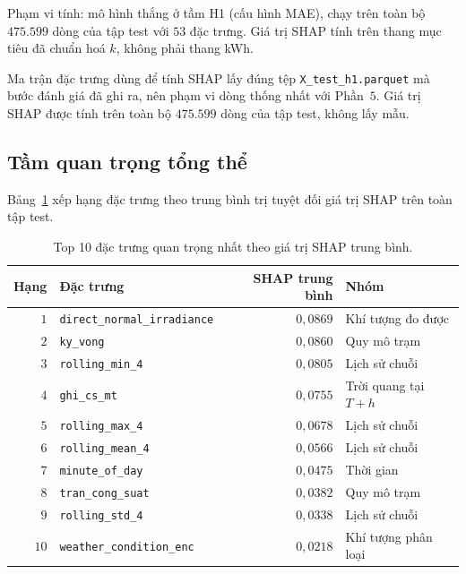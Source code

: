 \documentclass[12pt, a4paper]{report}
\begin{document}
Phạm vi tính: mô hình thắng ở tầm H1 (cấu hình MAE), chạy trên toàn bộ $475.599$ dòng của tập
test với $53$ đặc trưng. Giá trị SHAP tính trên thang mục tiêu đã chuẩn hoá $k$, không phải
thang kWh.

Ma trận đặc trưng dùng để tính SHAP lấy đúng tệp \texttt{X\_test\_h1.parquet} mà bước đánh giá đã
ghi ra, nên phạm vi dòng thống nhất với Phần~$5$. Giá trị SHAP được tính trên toàn bộ
$475.599$ dòng của tập test, không lấy mẫu.

\FloatBarrier
\subsection{Tầm quan trọng tổng thể}

Bảng~\ref{tab:shap_global} xếp hạng đặc trưng theo
trung bình trị tuyệt đối giá trị SHAP trên toàn tập test.

\begin{table}[htbp]
\centering
\caption{Top 10 đặc trưng quan trọng nhất theo giá trị SHAP trung bình.}
\label{tab:shap_global}
\small
\begin{tabular}{r l r l}
\toprule
\textbf{Hạng} & \textbf{Đặc trưng} & \textbf{SHAP trung bình} & \textbf{Nhóm} \\
\midrule
$1$  & \texttt{direct\_normal\_irradiance} & $0{,}0869$ & Khí tượng đo được \\
$2$  & \texttt{ky\_vong}                  & $0{,}0860$ & Quy mô trạm \\
$3$  & \texttt{rolling\_min\_4}            & $0{,}0805$ & Lịch sử chuỗi \\
$4$  & \texttt{ghi\_cs\_mt}                & $0{,}0755$ & Trời quang tại $T{+}h$ \\
$5$  & \texttt{rolling\_max\_4}            & $0{,}0678$ & Lịch sử chuỗi \\
$6$  & \texttt{rolling\_mean\_4}           & $0{,}0566$ & Lịch sử chuỗi \\
$7$  & \texttt{minute\_of\_day}            & $0{,}0475$ & Thời gian \\
$8$  & \texttt{tran\_cong\_suat}           & $0{,}0382$ & Quy mô trạm \\
$9$  & \texttt{rolling\_std\_4}            & $0{,}0338$ & Lịch sử chuỗi \\
$10$ & \texttt{weather\_condition\_enc}    & $0{,}0218$ & Khí tượng phân loại \\
\bottomrule
\end{tabular}
\end{table}
\end{document}
